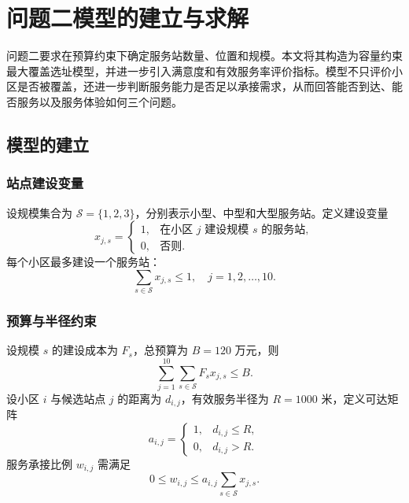 \section{问题二模型的建立与求解}

问题二要求在预算约束下确定服务站数量、位置和规模。本文将其构造为容量约束最大覆盖选址模型，并进一步引入满意度和有效服务率评价指标。模型不只评价小区是否被覆盖，还进一步判断服务能力是否足以承接需求，从而回答能否到达、能否服务以及服务体验如何三个问题。

\subsection{模型的建立}

\subsubsection{站点建设变量}

设规模集合为 $\mathcal{S}=\{1,2,3\}$，分别表示小型、中型和大型服务站。定义建设变量
\begin{equation}
 x_{j,s}=\begin{cases}
1, & \text{在小区 }j\text{ 建设规模 }s\text{ 的服务站},\\
0, & \text{否则}.
\end{cases}
\end{equation}
每个小区最多建设一个服务站：
\begin{equation}
\sum_{s\in\mathcal{S}}x_{j,s}\leq 1,\quad j=1,2,\ldots,10.
\end{equation}

\subsubsection{预算与半径约束}

设规模 $s$ 的建设成本为 $F_s$，总预算为 $B=120$ 万元，则
\begin{equation}
\sum_{j=1}^{10}\sum_{s\in\mathcal{S}}F_sx_{j,s}\leq B.
\end{equation}
设小区 $i$ 与候选站点 $j$ 的距离为 $d_{i,j}$，有效服务半径为 $R=1000$ 米，定义可达矩阵
\begin{equation}
a_{i,j}=\begin{cases}
1, & d_{i,j}\leq R,\\
0, & d_{i,j}>R.
\end{cases}
\end{equation}
服务承接比例 $w_{i,j}$ 需满足
\begin{equation}
0\leq w_{i,j}\leq a_{i,j}\sum_{s\in\mathcal{S}}x_{j,s}.
\end{equation}

